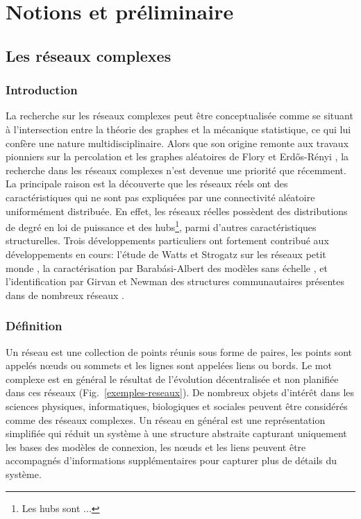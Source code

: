 %
\chapter{Notions et préliminaire}
\section{Les réseaux complexes}
\subsection{Introduction}
La recherche sur les réseaux complexes peut être conceptualisée comme se situant à l'intersection entre la théorie 
des graphes et la mécanique statistique, ce qui lui confère une nature multidisciplinaire. Alors que 
son origine remonte aux travaux pionniers sur la percolation et les graphes aléatoires de Flory \cite{Flory} et 
Erd\H{o}s-Rényi \cite{Erdos-Renyi1959,Erdos-Renyi1960,Erdos-Renyi1961}, la recherche dans les réseaux complexes n'est 
devenue une priorité que récemment. La principale raison  est la découverte que les réseaux réels ont des caractéristiques 
qui ne sont pas expliquées par une connectivité aléatoire uniformément distribuée. En effet, les réseaux  
réelles possèdent  des distributions de degré en loi de puissance et des hubs\footnote{Les hubs sont ...}, parmi d'autres caractéristiques 
structurelles. Trois développements particuliers ont fortement contribué aux 
développements en cours: l'étude de Watts et Strogatz sur les réseaux petit monde \cite{WS1998}, la caractérisation par
Barab\'{a}si-Albert des modèles sans échelle  \cite{BA1999}, et l'identification par Girvan et Newman des structures communautaires 
présentes dans de nombreux réseaux \cite{Girvan}.
\subsection{Définition}
Un \textsf{réseau} est une collection de points réunis sous forme de paires, les points sont appelés nœuds ou sommets 
et les lignes sont appelées liens ou bords. Le mot \textsf{complexe} est en général le résultat de  l'évolution
décentralisée et non planifiée dans ces réseaux (Fig.~\ref{exemples-reseaux}). De nombreux objets d'intérêt dans
les sciences physiques, informatiques, biologiques et sociales peuvent être considérés comme des réseaux complexes. 
Un réseau en général est une représentation simplifiée  qui réduit un système à une structure abstraite capturant 
uniquement les bases des modèles de connexion, les nœuds  et les liens peuvent être accompagnés
d'informations supplémentaires pour capturer plus de détails du système. 


